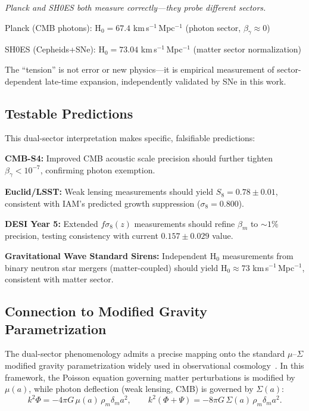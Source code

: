 \documentclass[twocolumn,superscriptaddress,prd,amsmath,amssymb]{revtex4-2}
\begin{document}
\textit{Planck and SH0ES both measure correctly---they probe different sectors.}

Planck (CMB photons): H$_0 = 67.4$ km\,s$^{-1}$\,Mpc$^{-1}$ (photon sector, $\beta_\gamma \approx 0$)

SH0ES (Cepheids+SNe): H$_0 = 73.04$ km\,s$^{-1}$\,Mpc$^{-1}$ (matter sector normalization)

The ``tension'' is not error or new physics---it is empirical measurement of sector-dependent late-time expansion, independently validated by SNe in this work.

\subsection{Testable Predictions}

This dual-sector interpretation makes specific, falsifiable predictions:

\textbf{CMB-S4:} Improved CMB acoustic scale precision should further tighten $\beta_\gamma < 10^{-7}$, confirming photon exemption.

\textbf{Euclid/LSST:} Weak lensing measurements should yield $S_8 = 0.78 \pm 0.01$, consistent with IAM's predicted growth suppression ($\sigma_8 = 0.800$).

\textbf{DESI Year 5:} Extended $f\sigma_8(z)$ measurements should refine $\beta_m$ to $\sim1\%$ precision, testing consistency with current $0.157 \pm 0.029$ value.

\textbf{Gravitational Wave Standard Sirens:} Independent H$_0$ measurements from binary neutron star mergers (matter-coupled) should yield H$_0 \approx 73$ km\,s$^{-1}$\,Mpc$^{-1}$, consistent with matter sector.

\subsection{Connection to Modified Gravity Parametrization}

The dual-sector phenomenology admits a precise mapping onto the standard $\mu$--$\Sigma$ modified gravity parametrization widely used in observational cosmology~\cite{Amendola2020}. In this framework, the Poisson equation governing matter perturbations is modified by $\mu(a)$, while photon deflection (weak lensing, CMB) is governed by $\Sigma(a)$:
\begin{equation}
k^2 \Phi = -4\pi G\, \mu(a)\, \rho_m \delta_m a^2, \qquad k^2(\Phi + \Psi) = -8\pi G\, \Sigma(a)\, \rho_m \delta_m a^2.
\end{equation}
\end{document}
